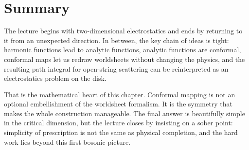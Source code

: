 \section{Summary}

The lecture begins with two-dimensional electrostatics and ends by returning to it from an unexpected direction. In between, the key chain of ideas is tight: harmonic functions lead to analytic functions, analytic functions are conformal, conformal maps let us redraw worldsheets without changing the physics, and the resulting path integral for open-string scattering can be reinterpreted as an electrostatics problem on the disk.

That is the mathematical heart of this chapter. Conformal mapping is not an optional embellishment of the worldsheet formalism. It is the symmetry that makes the whole construction manageable. The final answer is beautifully simple in the critical dimension, but the lecture closes by insisting on a sober point: simplicity of prescription is not the same as physical completion, and the hard work lies beyond this first bosonic picture.